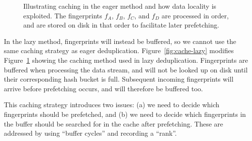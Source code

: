 \documentclass[prodmode,acmtecs]{acmsmall}
\begin{document}
\begin{figure}[htbp]
{{
}
}

\caption{Illustrating caching in the eager method and how data locality is exploited.  The fingerprints $f_A$, $f_B$, $f_C$, and $f_D$ are processed in order, and are stored on disk in that order to facilitate later prefetching.}
\label{fig:cache-eager}
\end{figure}

In the lazy method, fingerprints will instead be buffered, so we cannot use the same caching strategy as eager deduplication.  Figure~\ref{fig:cache-lazy} modifies Figure~\ref{fig:cache-eager} showing the caching method used in lazy deduplication.  Fingerprints are buffered when processing the data stream, and will not be looked up on disk until their corresponding hash bucket is full. Subsequent incoming fingerprints will arrive before prefetching occurs, and will therefore be buffered too.

This caching strategy introduces two issues: (a) we need to decide which fingerprints should be prefetched, and (b) we need to decide which fingerprints in the buffer should be searched for in the cache after prefetching.  These are addressed by using ``buffer cycles'' and recording a ``rank''.
\end{document}
